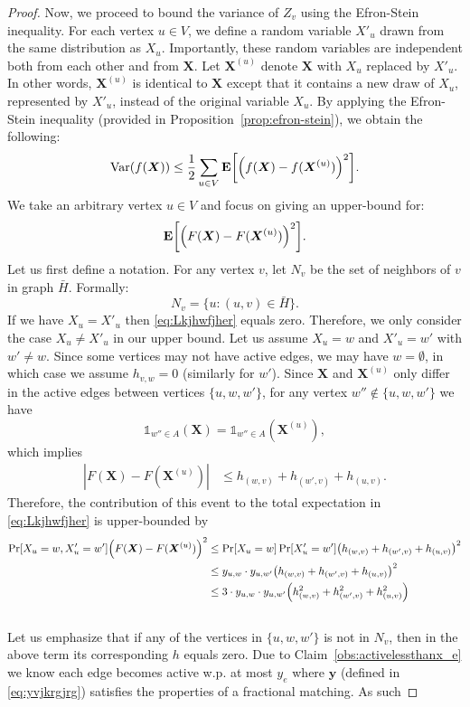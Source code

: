\documentclass[letterpaper,11pt]{article}
\DeclareMathOperator{\E}{\ensuremath{\normalfont \textbf{E}}}
\newcommand{\adj}{\ensuremath{N}\xspace}
\newcommand{\funcZ}[0]{f}
\DeclareMathOperator{\var}{Var}
\let\originalleft\left
\let\originalright\right
\renewcommand{\left}{\mathopen{}\mathclose\bgroup\originalleft}
\renewcommand{\right}{\aftergroup\egroup\originalright}
\begin{document}
\begin{proof}
Now, we proceed to bound the variance of $Z_v$ using the Efron-Stein inequality. For each vertex $u\in V$, we define a random variable $X'_u$ drawn from the same distribution as $X_u$. Importantly, these random variables are independent both from each other and from $\bm{X}$. Let $\bm{X}^{(u)}$ denote $\bm{X}$ with $X_u$ replaced by $X'_u$. In other words, $\bm{X}^{(u)}$ is identical to $\bm{X}$ except that it contains a new draw of $X_u$, represented by $X'_u$, instead of the original variable $X_u$. By applying the Efron-Stein inequality (provided in Proposition~\ref{prop:efron-stein}), we obtain the following:
    $$ 
    \var(\funcZ(\bm{X})) \leq \frac{1}{2} \sum_{u\in V} \E\left[\left(\funcZ(\bm{X}) - \funcZ(\bm{X}^{(u)}) \right)^2\right].
    $$
We take an arbitrary vertex $u\in V$ and focus on giving  an upper-bound for:
\begin{equation}\label{eq:Lkjhwfjher}
    \E\left[\left(F(\bm{X}) - F(\bm{X}^{(u)}) \right)^2\right].
\end{equation} 
Let us first define a notation. For any vertex $v$, let  $\adj_v$ be the set of neighbors of $v$ in graph $\bar{H}$. Formally: \begin{equation}
    \adj_v = \{u : (u, v) \in \bar{H}\}.
\end{equation} 
If  we have $X_u = X'_u$ then \eqref{eq:Lkjhwfjher} equals zero. Therefore, we only consider the case $X_u \neq X'_u$ in our upper bound. 
Let us assume  $X_u= w$ and $X'_u = w'$ with $w'\neq w$. Since some vertices may not have active edges, we may have $w=\emptyset$, in which case we assume $h_{v,w }=0$ (similarly for $w'$). Since $\bm{X}$ and  $\bm{X}^{(u)}$ only differ in the active edges between vertices $\{u,w, w'\}$, for any vertex $w'' \notin \{u,w, w'\}$ we have $$\mathds{1}_{w''\in A}(\bm{X})=\mathds{1}_{w''\in A}(\bm{X}^{(u)}),$$ which implies
\begin{align*}
    |F(\bm{X})-F(\bm{X}^{(u)})|& \leq h_{(w,v)} + h_{(w',v)} +  h_{(u,v)}.
\end{align*} 
Therefore, the contribution of this event to the total expectation in \eqref{eq:Lkjhwfjher} is upper-bounded by
\begin{align*}
    \Pr\left[X_u=w, X'_u=w'\right]\left(F(\bm{X})-F(\bm{X}^{(u)})\right)^2 & \leq  \Pr[X_u=w]\Pr[X'_u=w']\left(h_{(w,v)} + h_{(w',v)} + h_{(u,v)}\right)^2\\
& \leq  y_{u,w}\cdot y_{u,w'}\left(h_{(w,v)} + h_{(w',v)}+h_{(u,v)}\right)^2\\
& \leq 3\cdot y_{u,w}\cdot y_{u,w'} \left(h_{(w,v)}^2 + h_{(w',v)}^2+h_{(u,v)}^2\right)
\end{align*}
\\
Let us emphasize that if any of the vertices in $\{u, w, w'\}$ is not in $\adj_v$, then in the above term its corresponding  $h$ equals zero. 
Due to Claim~\ref{obs:activelessthanx_e} we know  each edge becomes active w.p. at most $y_e$ where $\bm{y}$ (defined in \ref{eq:yvjkrgjrg}) satisfies the properties of a fractional matching. As such


\end{proof}
\end{document}
